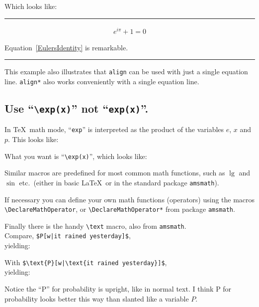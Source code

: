 \documentclass{article}
\newcommand*\𝚝[1]{\texttt{#1}}%
\begin{document}
Which looks like:
\vspace{1ex}\hrule
\begin{align}
e^{iπ} + 1 = 0  \label{EulersIdentity}
\end{align}

Equation~\ref{EulersIdentity} is remarkable.
\vspace{1ex}\hrule\vspace{2ex}

This example also illustrates that \𝚝{align} can be used with just a single equation line.
\𝚝{align*} also works conveniently with a single equation line.


\subsection*{Use ``\𝚝{\textbackslash exp(x)}'' not ``\𝚝{exp(x)}''.}
In \TeX\ math mode, ``\𝚝{exp}'' is interpreted as the product of the variables $e$, $x$ and $p$.
This looks like:
\begin{center}\end{center}
What you want is ``\𝚝{\textbackslash exp(x)}'', which looks like:
\begin{center}\end{center}

Similar macros are predefined for most common math functions, such as $\lg$ and $\sin$ etc.\
(either in basic \LaTeX\ or in the standard package \𝚝{amsmath}).

\begin{samepage}
If necessary you can define your own math functions (operators) using the macros \𝚝{\textbackslash DeclareMathOperator}, or \𝚝{\textbackslash DeclareMathOperator*} from package \𝚝{amsmath}.

Finally there is the handy \𝚝{\textbackslash text} macro, also from \𝚝{amsmath}.\\
Compare, \𝚝{\$P[w|it rained yesterday]\$},\\
yielding:
\begin{center}\end{center}
With \𝚝{\$\textbackslash text\{P\}[w|\textbackslash text\{it rained yesterday\}]\$},\\
yielding:
\begin{center}\end{center}
Notice the ``P'' for probability is upright, like in normal text.  I think P for probability looks better this way than slanted like a variable $P$.
\end{samepage}
\end{document}
